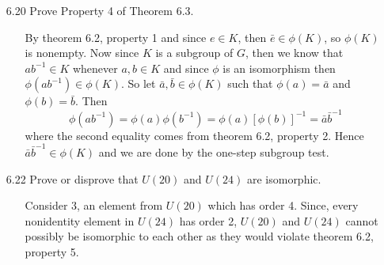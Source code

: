 \documentclass[12pt]{article}
\begin{document}
\begin{enumerate}
\item[6.20] Prove Property 4 of Theorem 6.3.
\begin{enumerate}
\item[] By theorem 6.2, property 1 and since $e \in K$, then $\bar{e} \in \phi(K)$, so
$\phi(K)$ is nonempty. Now since $K$ is a subgroup of $G$, then we know that $ab^{-1} \in K$
whenever $a, b \in K$ and since $\phi$ is an isomorphism then $\phi(ab^{-1}) \in \phi(K)$. 
So let $\bar{a}, \bar{b} \in \phi(K)$ such that $\phi(a) = \bar{a}$ and
$\phi(b) = \bar{b}$. Then 
\[ 
\phi(ab^{-1}) = \phi(a)\phi(b^{-1}) = \phi(a)[\phi(b)]^{-1} = \bar{a}\bar{b}^{-1}
\]
where the second equality comes from theorem 6.2, property 2. 
Hence $\bar{a}\bar{b}^{-1} \in \phi(K)$ and we are done by the one-step subgroup test.
\end{enumerate}

\item[6.22] Prove or disprove that $U(20)$ and $U(24)$ are isomorphic.
\begin{enumerate}
\item[] Consider 3, an element from $U(20)$ which has order 4. Since, every nonidentity
element in $U(24)$ has order 2, $U(20)$ and $U(24)$ cannot possibly be isomorphic to each
other as they would violate theorem 6.2, property 5.
\end{enumerate}


\end{enumerate}
\end{document}
